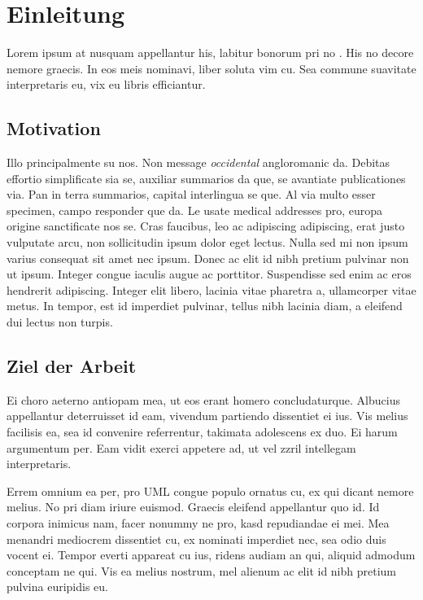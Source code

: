 \chapter{Einleitung}
\label{ch:intro_}
Lorem ipsum at nusquam appellantur his, labitur bonorum pri no \citep{dueck:trio}. His no decore nemore graecis. In eos meis nominavi, liber soluta vim cu. Sea commune suavitate interpretaris eu, vix eu libris efficiantur.

%
%
\section{Motivation}
\label{sec:intro:motivation}
Illo principalmente su nos. Non message \emph{occidental} angloromanic da. Debitas effortio simplificate sia se, auxiliar summarios da que, se avantiate publicationes via. Pan in terra summarios, capital interlingua se que. Al via multo esser specimen, campo responder que da. Le usate medical addresses pro, europa origine sanctificate nos se. Cras faucibus, leo ac adipiscing adipiscing, erat justo vulputate arcu, non sollicitudin ipsum dolor eget lectus. Nulla sed mi non ipsum varius consequat sit amet nec ipsum. Donec ac elit id nibh pretium pulvinar non ut ipsum. Integer congue iaculis augue ac porttitor. Suspendisse sed enim ac eros hendrerit adipiscing. Integer elit libero, lacinia vitae pharetra a, ullamcorper vitae metus. In tempor, est id imperdiet pulvinar, tellus nibh lacinia diam, a eleifend dui lectus non turpis.

%
%
\section{Ziel der Arbeit}
\label{sec:intro:goal}
Ei choro aeterno antiopam mea, ut eos erant homero concludaturque. Albucius appellantur deterruisset id eam, vivendum partiendo dissentiet ei ius. Vis melius facilisis ea, sea id convenire referrentur, takimata adolescens ex duo. Ei harum argumentum per. Eam vidit exerci appetere ad, ut vel zzril intellegam interpretaris.

Errem omnium ea per, pro \ac{UML} congue populo ornatus cu, ex qui dicant nemore melius. No pri diam iriure euismod. Graecis eleifend appellantur quo id. Id corpora inimicus nam, facer nonummy ne pro, kasd repudiandae ei mei. Mea menandri mediocrem dissentiet cu, ex nominati imperdiet nec, sea odio duis vocent ei. Tempor everti appareat cu ius, ridens audiam an qui, aliquid admodum conceptam ne qui. Vis ea melius nostrum, mel alienum ac elit id nibh pretium pulvina euripidis eu.

